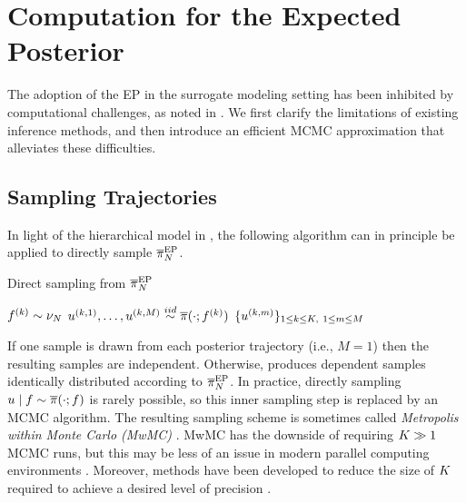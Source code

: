 \documentclass[12pt]{article}
\begin{document}
\section{Computation for the Expected Posterior} \label{sec:computation}
The adoption of the EP in the surrogate modeling setting has been 
inhibited by computational challenges, as noted in 
\citet{VehtariParallelGP,StuartTeck2}. We first clarify the limitations
of existing inference methods, and then introduce an efficient MCMC 
approximation that alleviates these difficulties.

\subsection{Sampling Trajectories}
In light of the hierarchical model in , the following 
algorithm can in principle be applied to directly sample $\overline{\pi}_{N}^{\mathrm{EP}}$.  

\begin{algorithm}[H]
    \caption{Direct sampling from $\overline{\pi}_{N}^{\mathrm{EP}}$}
    \label{alg:ep}
    \begin{algorithmic}[1]
        		\State $f^{(k)} \sim \nu_{N}$ 
		\State $u^{(k, 1)}, \dots, u^{(k, M)} \overset{iid}{\sim} \overline{\pi}(\cdot; f^{(k)})$ 
	\EndFor
	\State \Return $\{u^{(k, m)}\}_{1 \leq k \leq K, \ 1 \leq m \leq M}$
	\EndFunction
    \end{algorithmic}
\end{algorithm}
If one sample is drawn from each posterior trajectory (i.e., $M=1$) then the resulting samples are 
independent. Otherwise,  produces dependent samples identically distributed according to
$\overline{\pi}_{N}^{\mathrm{EP}}$. In practice, directly sampling $u \mid f \sim \overline{\pi}(\cdot; f)$
is rarely possible, so this inner sampling step is replaced by an MCMC algorithm.
The resulting sampling scheme is sometimes called \textit{Metropolis within Monte Carlo (MwMC)} 
\citep{garegnani2021NoisyMCMC}. MwMC has the downside of requiring $K \gg 1$
MCMC runs, but this may be less of an issue in modern parallel computing environments \citep{BurknerSurrogate}. 
Moreover, methods have been developed to reduce the size of $K$ required to achieve a
desired level of precision \citep{BurknerTwoStep}. 
\end{document}
